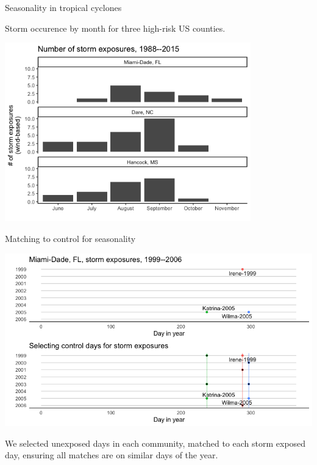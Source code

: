\documentclass[ignorenonframetext,]{beamer}
\begin{document}
\begin{frame}{Seasonality in tropical cyclones}

Storm occurence by month for three high-risk US counties.

\begin{center}\includegraphics[width=0.8\textwidth]{figures/storm_seasonality} \end{center}

\end{frame}

\begin{frame}{Matching to control for seasonality}

\begin{center}\includegraphics[width=\textwidth]{figures/example_picking_controls} \end{center}

\small We selected unexposed days in each community, matched to each
storm exposed day, ensuring all matches are on similar days of the year.

\end{frame}
\end{document}
